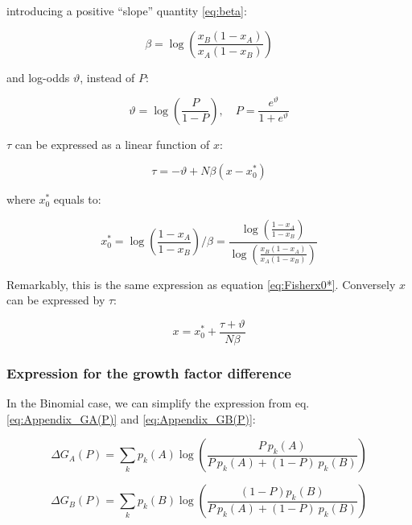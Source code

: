 \documentclass{article}
\theoremstyle{definition}
\begin{document}
introducing a positive ``slope'' quantity \eqref{eq:beta}:

\begin{equation}
    \beta = \log \left ( \frac{x_B (1-x_A)}{x_A (1-x_B)} \right )
\end{equation}

and log-odds $\vartheta$, instead of $P$:

\begin{equation}
\label{eq:varthetaP}
    \vartheta = \log \left ( \frac{P}{1-P} \right ), \quad
    P = \frac{e^\vartheta}{1+e^\vartheta}
\end{equation}

$\tau$ can be expressed as a linear function of $x$:

\begin{equation}
    \tau = - \vartheta + N \beta (x-x_0^*)
\end{equation}

where $x_0^*$ equals to:

\begin{equation}
    x_0^* = \log \left ( \frac{1-x_A}{1-x_B} \right )/\beta =  \frac{\log \left ( \frac{1-x_A}{1-x_B} \right )}{\log \left ( \frac{x_B (1-x_A)}{x_A (1-x_B)} \right )}
\end{equation}

Remarkably, this is the same expression as equation \eqref{eq:Fisherx0*}.
Conversely $x$ can be expressed by $\tau$:

\begin{equation}
    x = x_0^* + \frac{\tau + \vartheta}{N \beta}
\end{equation}

\subsubsection{Expression for the growth factor difference}

In the Binomial case, we can simplify the expression from eq. \eqref{eq:Appendix_GA(P)} and \eqref{eq:Appendix_GB(P)}:

\begin{equation}
    \Delta G_A(P) = \sum_{k} p_k(A) \log \left ( \frac{P \ p_k(A)}{P \ p_k(A)+(1-P) \ p_k(B)} \right )
\end{equation}

\begin{equation}
    \Delta G_B(P) = \sum_{k} p_k(B) \log \left ( \frac{(1-P) p_k(B)}{P \ p_k(A)+(1-P) \ p_k(B)} \right )
\end{equation}
\end{document}
